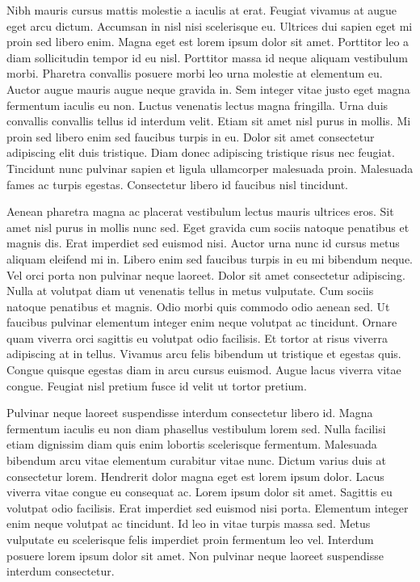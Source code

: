 \documentclass{rust-edu-workshop}
\begin{document}
  Nibh mauris cursus mattis molestie a iaculis at
  erat. Feugiat vivamus at augue eget arcu dictum. Accumsan
  in nisl nisi scelerisque eu. Ultrices dui sapien eget mi
  proin sed libero enim. Magna eget est lorem ipsum dolor
  sit amet. Porttitor leo a diam sollicitudin tempor id eu
  nisl. Porttitor massa id neque aliquam vestibulum
  morbi. Pharetra convallis posuere morbi leo urna molestie
  at elementum eu. Auctor augue mauris augue neque gravida
  in. Sem integer vitae justo eget magna fermentum iaculis
  eu non. Luctus venenatis lectus magna fringilla. Urna duis
  convallis convallis tellus id interdum velit. Etiam sit
  amet nisl purus in mollis. Mi proin sed libero enim sed
  faucibus turpis in eu. Dolor sit amet consectetur
  adipiscing elit duis tristique. Diam donec adipiscing
  tristique risus nec feugiat. Tincidunt nunc pulvinar
  sapien et ligula ullamcorper malesuada proin. Malesuada
  fames ac turpis egestas. Consectetur libero id faucibus
  nisl tincidunt.

  Aenean pharetra magna ac placerat vestibulum lectus mauris
  ultrices eros. Sit amet nisl purus in mollis nunc
  sed. Eget gravida cum sociis natoque penatibus et magnis
  dis. Erat imperdiet sed euismod nisi. Auctor urna nunc id
  cursus metus aliquam eleifend mi in. Libero enim sed
  faucibus turpis in eu mi bibendum neque. Vel orci porta
  non pulvinar neque laoreet. Dolor sit amet consectetur
  adipiscing. Nulla at volutpat diam ut venenatis tellus in
  metus vulputate. Cum sociis natoque penatibus et
  magnis. Odio morbi quis commodo odio aenean sed. Ut
  faucibus pulvinar elementum integer enim neque volutpat ac
  tincidunt. Ornare quam viverra orci sagittis eu volutpat
  odio facilisis. Et tortor at risus viverra adipiscing at
  in tellus. Vivamus arcu felis bibendum ut tristique et
  egestas quis. Congue quisque egestas diam in arcu cursus
  euismod. Augue lacus viverra vitae congue. Feugiat nisl
  pretium fusce id velit ut tortor pretium.

  Pulvinar neque laoreet suspendisse interdum consectetur
  libero id. Magna fermentum iaculis eu non diam phasellus
  vestibulum lorem sed. Nulla facilisi etiam dignissim diam
  quis enim lobortis scelerisque fermentum. Malesuada
  bibendum arcu vitae elementum curabitur vitae nunc. Dictum
  varius duis at consectetur lorem. Hendrerit dolor magna
  eget est lorem ipsum dolor. Lacus viverra vitae congue eu
  consequat ac. Lorem ipsum dolor sit amet. Sagittis eu
  volutpat odio facilisis. Erat imperdiet sed euismod nisi
  porta. Elementum integer enim neque volutpat ac
  tincidunt. Id leo in vitae turpis massa sed. Metus
  vulputate eu scelerisque felis imperdiet proin fermentum
  leo vel. Interdum posuere lorem ipsum dolor sit amet. Non
  pulvinar neque laoreet suspendisse interdum consectetur.
\end{document}
